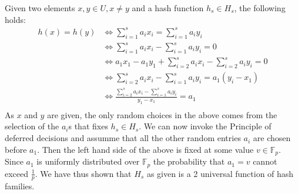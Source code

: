 \documentclass[article,a4paper,oneside]{article}
\newcommand{\+}[1]{\ensuremath{\boldsymbol{#1}}}
\begin{document}
Given two elements $x,y \in U, x \neq y$ and a hash function $h_s \in H_s$, the following holds:
\begin{align*}
h(x) = h(y) &\iff \sum_{i=1}^{s}a_ix_i = \sum_{i=1}^sa_iy_i \\
&\iff \sum_{i=1}^{s}a_ix_i - \sum_{i=1}^sa_iy_i = 0 \\
&\iff a_1x_1 - a_1y_1 + \sum_{i=2}^{s}a_ix_i - \sum_{i=2}^sa_iy_i = 0 \\
&\iff \sum_{i=2}^{s}a_ix_i - \sum_{i=1}^sa_iy_i = a_1(y_i-x_1) \\
&\iff \frac{\sum_{i=2}^{s}a_ix_i - \sum_{i=1}^sa_iy_i}{y_1-x_1} = a_1 \\
\end{align*}
As $x$ and $y$ are given, the only random choices in the above comes from the selection of the $a_i$s that fixes $h_s \in H_s$. We can now invoke the Principle of deferred decisions and assumme that all the other random entries $a_i$ are chosen before $a_1$. Then the left hand side of the above is fixed at some value $v \in \mathbb{F}_p$. Since $a_1$ is uniformly distributed over $\mathbb{F}_p$ the probability that $a_1 = v$ cannot exceed $\frac{1}{p}$. We have thus shown that $H_s$ as given is a 2 universal function of hash families.
\end{document}
